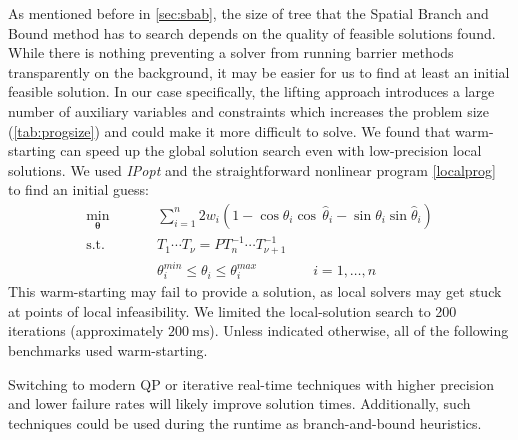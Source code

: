 As mentioned before in \cref{sec:sbab}, the size of tree that the Spatial Branch and Bound method has to search depends on the quality of feasible solutions found. While there is nothing preventing a solver from running barrier methods transparently on the background, it may be easier for us to find at least an initial feasible solution. In our case specifically, the lifting approach introduces a large number of auxiliary variables and constraints which increases the problem size (\cref{tab:progsize}) and could make it more difficult to solve. We found that warm-starting can speed up the global solution search even with low-precision local solutions. We used \emph{IPopt} \cite{ipopt} and the straightforward nonlinear program \ref{localprog} to find an initial guess:
\begin{equation}
\label{localprog}
\begin{aligned}
\min_{\symbf{\theta}} &\quad&& \sum_{i=1}^n 2w_i(1-\cos\theta_i\cos\,\hat{\theta}_i-\sin\theta_i\sin\hat{\theta}_i)     \\
\text{s.t.}   &\quad&&    T_1\dotsb T_\nu = P T_n^{-1}\dotsb T_{\nu+1}^{-1}   \\
              &\quad&&   \theta^{min}_i \leq \theta_i \leq \theta^{max}_i   \hspace{4em} i=1,\dots,n
\end{aligned}
\end{equation}
This warm-starting may fail to provide a solution, as local solvers may get stuck at points of local infeasibility. We limited the local-solution search to 200 iterations (approximately $\qty{200}{\milli\second}$). Unless indicated otherwise, all of the following benchmarks used warm-starting.

Switching to modern QP or iterative real-time techniques with higher precision and lower failure rates will likely improve solution times. Additionally, such techniques could be used during the runtime as branch-and-bound heuristics.

